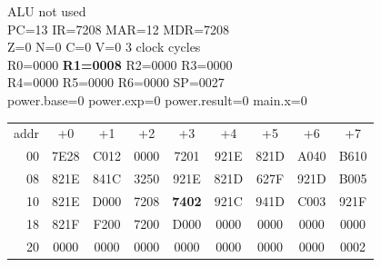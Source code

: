 \begin{tcolorbox}[stepbox, title={Step 3 \hfill PC 12 \quad LI R1, 8}]
\textcolor{dim}{ALU} \textcolor{dim}{not used}\\
PC=13 IR=7208 MAR=12 MDR=7208\\
Z=0 N=0 C=0 V=0 \hfill \textcolor{dim}{3 clock cycles}\\
R0=0000 \textcolor{wrt}{\textbf{R1=0008}} R2=0000 R3=0000\\
R4=0000 R5=0000 R6=0000 SP=0027\\
\textcolor{dim}{power.base=0  power.exp=0  power.result=0  main.x=0}\\[1pt]
{\setlength{\tabcolsep}{1.6pt}\begin{tabular}{@{}r*{8}{c}@{}}
\textcolor{dim}{addr} & \textcolor{dim}{+0} & \textcolor{dim}{+1} & \textcolor{dim}{+2} & \textcolor{dim}{+3} & \textcolor{dim}{+4} & \textcolor{dim}{+5} & \textcolor{dim}{+6} & \textcolor{dim}{+7}\\
\textcolor{dim}{00} & 7E28 & C012 & 0000 & 7201 & 921E & 821D & A040 & B610\\
\textcolor{dim}{08} & 821E & 841C & 3250 & 921E & 821D & 627F & 921D & B005\\
\textcolor{dim}{10} & 821E & D000 & 7208 & \cellcolor{pcc}\textbf{7402} & 921C & 941D & C003 & 921F\\
\textcolor{dim}{18} & 821F & F200 & 7200 & D000 & \cellcolor{datac}0000 & \cellcolor{datac}0000 & \cellcolor{datac}0000 & \cellcolor{datac}0000\\
\textcolor{dim}{20} & \cellcolor{stackc}0000 & \cellcolor{stackc}0000 & \cellcolor{stackc}0000 & \cellcolor{stackc}0000 & \cellcolor{stackc}0000 & \cellcolor{stackc}0000 & \cellcolor{stackc}0000 & \cellcolor{stackc}0002\\
\end{tabular}}
\end{tcolorbox}\par\vspace{3pt}
